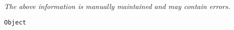 \label{pkg:object}

{\tiny \it The above information is manually maintained and may contain errors.}
\begin{verbatim}
Object
\end{verbatim}
